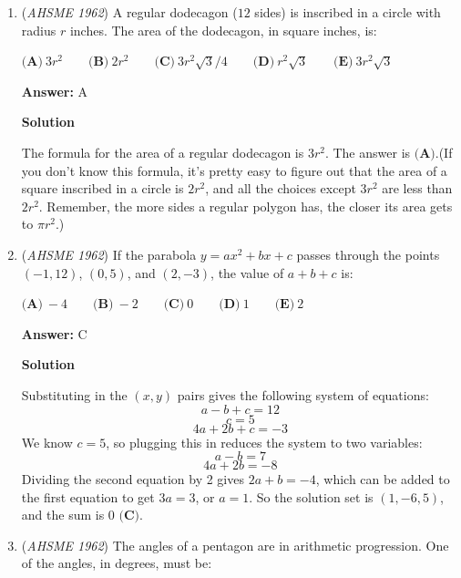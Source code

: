 \begin{enumerate}
\textbf{Solution}

Using the change-of-base rule: $a = \frac{\log 225}{\log 8}$ and $b = \frac{\log 15}{\log 2}$.
 \[\frac{a}{b} = \frac{\log 225 \log 2}{\log 8 \log 15}\]
 \[a = b \cdot \frac{\log 225}{\log 15} \cdot \frac{\log 2}{\log 8}\]
 \[a = b \log_{15} 225 \log_8 2\]
 \[a = \boxed{\frac{2b}3 \textbf{ (B)}}\]



	\item (\textit{AHSME 1962}) A regular dodecagon ($12$ sides) is inscribed in a circle with radius $r$ inches. The area of the dodecagon, in square inches, is:


 $\textbf{(A)}\ 3r^2 \qquad  \textbf{(B)}\ 2r^2 \qquad  \textbf{(C)}\ 3r^2\sqrt{3}/4 \qquad  \textbf{(D)}\ r^2\sqrt{3} \qquad  \textbf{(E)}\ 3r^2\sqrt{3}$

 \textbf{Answer: }A



\textbf{Solution}

The formula for the area of a regular dodecagon is $3r^2$. The answer is $\boxed{\textbf{(A)}}$.(If you don't know this formula, it's pretty easy to figure out that the area of a square inscribed in a circle is $2r^2$, and all the choices except $3r^2$ are less than $2r^2$. Remember, the more sides a regular polygon has, the closer its area gets to $\pi r^2$.)

 


	\item (\textit{AHSME 1962}) If the parabola $y = ax^2 + bx + c$ passes through the points $(-1, 12)$, $(0, 5)$, and $(2, -3)$, the value of $a + b + c$ is:


 $\textbf{(A)}\ -4 \qquad  \textbf{(B)}\ -2 \qquad  \textbf{(C)}\ 0 \qquad  \textbf{(D)}\ 1 \qquad  \textbf{(E)}\ 2$

 \textbf{Answer: }C



\textbf{Solution}

Substituting in the $(x, y)$ pairs gives the following system of equations:
 \[a-b+c=12\]
 \[c=5\]
 \[4a+2b+c=-3\]We know $c=5$, so plugging this in reduces the system to two variables:
 \[a-b=7\]
 \[4a+2b=-8\]Dividing the second equation by 2 gives $2a+b=-4$, which can be added to the first equation to get $3a=3$, or $a=1$. So the solution set is $(1, -6, 5)$, and the sum is $\boxed{0\textbf{ (C)}}$.

 


	\item (\textit{AHSME 1962}) The angles of a pentagon are in arithmetic progression. One of the angles, in degrees, must be:



\end{enumerate}
